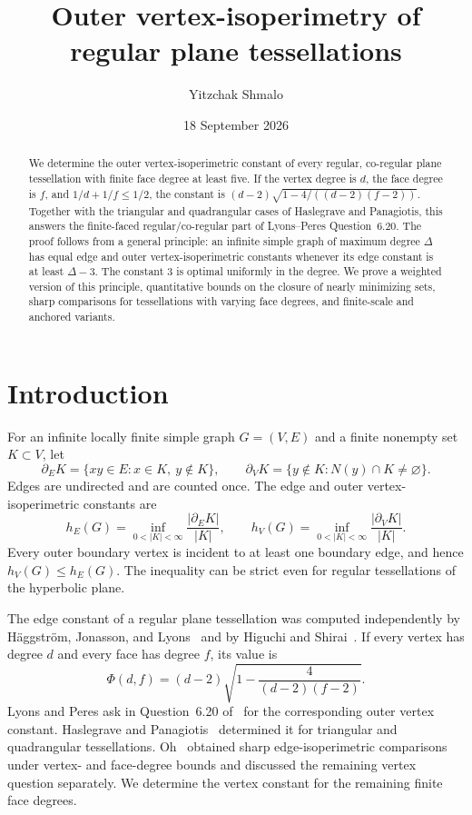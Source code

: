 \documentclass[11pt]{amsart}
\title[Outer vertex-isoperimetry]{Outer vertex-isoperimetry of regular plane tessellations}
\author{Yitzchak Shmalo}
\date{18 September 2026}
\numberwithin{equation}{section}
\theoremstyle{definition}
\theoremstyle{remark}
\newcommand{\hE}{h_E}
\newcommand{\hV}{h_V}
\newcommand{\bE}{\partial_E}
\newcommand{\bV}{\partial_V}
\begin{document}
\begin{abstract}
We determine the outer vertex-isoperimetric constant of every regular, co-regular plane tessellation with finite face degree at least five. If the vertex degree is $d$, the face degree is $f$, and $1/d+1/f\le 1/2$, the constant is
$(d-2)\sqrt{1-4/((d-2)(f-2))}$.
Together with the triangular and quadrangular cases of Haslegrave and Panagiotis, this answers the finite-faced regular/co-regular part of Lyons--Peres Question~6.20. The proof follows from a general principle: an infinite simple graph of maximum degree $\Delta$ has equal edge and outer vertex-isoperimetric constants whenever its edge constant is at least $\Delta-3$. The constant $3$ is optimal uniformly in the degree. We prove a weighted version of this principle, quantitative bounds on the closure of nearly minimizing sets, sharp comparisons for tessellations with varying face degrees, and finite-scale and anchored variants.
\end{abstract}
\maketitle

\section{Introduction}
For an infinite locally finite simple graph $G=(V,E)$ and a finite nonempty set $K\subset V$, let
\[
\bE K=\{xy\in E:x\in K,\ y\notin K\},\qquad
\bV K=\{y\notin K:N(y)\cap K\ne\varnothing\}.
\]
Edges are undirected and are counted once. The edge and outer vertex-isoperimetric constants are
\begin{equation}\label{eq:definitions}
\hE(G)=\inf_{0<|K|<\infty}\frac{|\bE K|}{|K|},\qquad
\hV(G)=\inf_{0<|K|<\infty}\frac{|\bV K|}{|K|}.
\end{equation}
Every outer boundary vertex is incident to at least one boundary edge, and hence $\hV(G)\le\hE(G)$. The inequality can be strict even for regular tessellations of the hyperbolic plane.

The edge constant of a regular plane tessellation was computed independently by H\"aggstr\"om, Jonasson, and Lyons~\cite{HJL} and by Higuchi and Shirai~\cite{HS}. If every vertex has degree $d$ and every face has degree $f$, its value is
\begin{equation}\label{eq:Phi}
\Phi(d,f)=(d-2)\sqrt{1-\frac4{(d-2)(f-2)}}.
\end{equation}
Lyons and Peres ask in Question~6.20 of~\cite{LP} for the corresponding outer vertex constant. Haslegrave and Panagiotis~\cite{HP} determined it for triangular and quadrangular tessellations. Oh~\cite{Oh} obtained sharp edge-isoperimetric comparisons under vertex- and face-degree bounds and discussed the remaining vertex question separately. We determine the vertex constant for the remaining finite face degrees.
\end{document}
